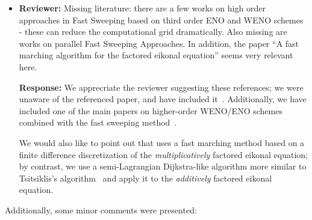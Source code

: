 \documentclass{article}
\begin{document}
\begin{itemize}
\item \textbf{Reviewer:} Missing literature: there are a few works on
  high order approaches in Fast Sweeping based on third order ENO and
  WENO schemes - these can reduce the computational grid
  dramatically. Also missing are works on parallel Fast Sweeping
  Approaches. In addition, the paper ``A fast marching algorithm for
  the factored eikonal equation'' seems very relevant here.

  \textbf{Response:} We apprecriate the reviewer suggesting these
  references; we were unaware of the referenced paper, and have
  included it~\cite{treister2016fast}. Additionally, we have included
  one of the main papers on higher-order WENO/ENO schemes combined
  with the fast sweeping method~\cite{zhang2006high}.

  We would also like to point out that \cite{treister2016fast} uses a
  fast marching method based on a finite difference discretization of
  the \emph{multiplicatively} factored eikonal equation; by contrast,
  we use a semi-Lagrangian Dijkstra-like algorithm more similar to
  Tsitsiklis's algorithm~\cite{tsitsiklis1995efficient} and apply it
  to the \emph{additively} factored eikonal equation.

\end{itemize}

Additionally, some minor comments were presented:
\end{document}
